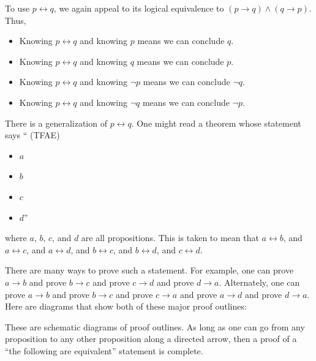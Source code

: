 \documentclass{book}
\theoremstyle{ekimcustom}
\newcommand\defn[1]{{\color{blue}{\bf #1}}}
\begin{document}
To use $p \leftrightarrow q$, we again appeal to its logical equivalence to $(p \rightarrow q) \wedge (q \rightarrow p)$. Thus,
\begin{itemize}
\item Knowing $p \leftrightarrow q$ and knowing $p$ means we can conclude $q$.
\item Knowing $p \leftrightarrow q$ and knowing $q$ means we can conclude $p$.
\item Knowing $p \leftrightarrow q$ and knowing $\neg p$ means we can conclude $\neg q$.
\item Knowing $p \leftrightarrow q$ and knowing $\neg q$ means we can conclude $\neg p$.
\end{itemize}
%
There is a generalization of $p \leftrightarrow q$. One might read a theorem whose statement says
``\defn{the following are equivalent}  (TFAE)
\begin{itemize}
\item $a$
\item $b$
\item $c$
\item $d$''
\end{itemize}
where $a$, $b$, $c$, and $d$ are all propositions. This is taken to mean that
$a \leftrightarrow b$, and
$a \leftrightarrow c$, and
$a \leftrightarrow d$, and
$b \leftrightarrow c$, and
$b \leftrightarrow d$, and
$c \leftrightarrow d$.

There are many ways to prove such a statement. For example, one can prove $a \rightarrow b$ and prove $b \rightarrow c$ and prove $c \rightarrow d$ and prove $d \rightarrow a$. Alternately, one can prove $a \rightarrow b$ and prove $b \rightarrow c$ and prove $c \rightarrow a$ and prove $a \rightarrow d$ and prove $d \rightarrow a$. Here are diagrams that show both of these major proof outlines:

\begin{center}
\quad\quad\quad
{}
\end{center}
These are schematic diagrams of proof outlines. As long as one can go from any proposition to any other proposition along a directed arrow, then a proof of a ``the following are equivalent'' statement is complete.
\end{document}
